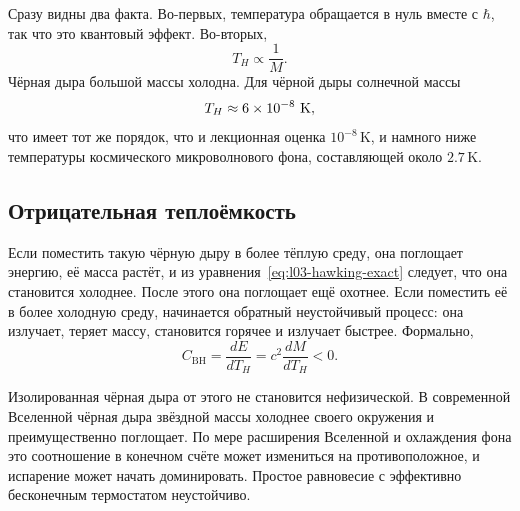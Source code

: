 Сразу видны два факта. Во-первых, температура обращается в нуль вместе с \(\hbar\), так что это квантовый эффект. Во-вторых,
\begin{equation}
T_H\propto\frac{1}{M}.
\end{equation}
Чёрная дыра большой массы холодна. Для чёрной дыры солнечной массы
\begin{equation}
T_H\approx6\times10^{-8}\ {\rm K},
\end{equation}
что имеет тот же порядок, что и лекционная оценка \(10^{-8}\,\mathrm{K}\), и намного ниже температуры космического микроволнового фона, составляющей около \(2.7\,\mathrm{K}\).

\subsection{Отрицательная теплоёмкость}

Если поместить такую чёрную дыру в более тёплую среду, она поглощает энергию, её масса растёт, и из уравнения~\eqref{eq:l03-hawking-exact} следует, что она становится холоднее. После этого она поглощает ещё охотнее. Если поместить её в более холодную среду, начинается обратный неустойчивый процесс: она излучает, теряет массу, становится горячее и излучает быстрее. Формально,
\begin{equation}
C_{\mathrm{BH}}
=\frac{dE}{dT_H}
=c^2\frac{dM}{dT_H}
<0.
\end{equation}

\begin{classroomqa}
\end{classroomqa}

Изолированная чёрная дыра от этого не становится нефизической. В современной Вселенной чёрная дыра звёздной массы холоднее своего окружения и преимущественно поглощает. По мере расширения Вселенной и охлаждения фона это соотношение в конечном счёте может измениться на противоположное, и испарение может начать доминировать. Простое равновесие с эффективно бесконечным термостатом неустойчиво.

